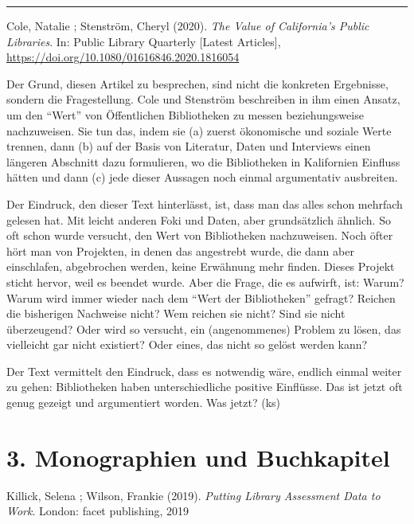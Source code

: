 \documentclass[a4paper,
fontsize=11pt,
oneside,
numbers=noperiodatend,
parskip=half-,
bibliography=totoc,
final
]{scrartcl}
\begin{document}
\begin{center}\rule{0.5\linewidth}{0.5pt}\end{center}

Cole, Natalie ; Stenström, Cheryl (2020). \emph{The Value of
California's Public Libraries}. In: Public Library Quarterly {[}Latest
Articles{]}, \url{https://doi.org/10.1080/01616846.2020.1816054}

Der Grund, diesen Artikel zu besprechen, sind nicht die konkreten
Ergebnisse, sondern die Fragestellung. Cole und Stenström beschreiben in
ihm einen Ansatz, um den \enquote{Wert} von Öffentlichen Bibliotheken zu
messen beziehungsweise nachzuweisen. Sie tun das, indem sie (a) zuerst
ökonomische und soziale Werte trennen, dann (b) auf der Basis von
Literatur, Daten und Interviews einen längeren Abschnitt dazu
formulieren, wo die Bibliotheken in Kalifornien Einfluss hätten und dann
(c) jede dieser Aussagen noch einmal argumentativ ausbreiten.

Der Eindruck, den dieser Text hinterlässt, ist, dass man das alles schon
mehrfach gelesen hat. Mit leicht anderen Foki und Daten, aber
grundsätzlich ähnlich. So oft schon wurde versucht, den Wert von
Bibliotheken nachzuweisen. Noch öfter hört man von Projekten, in denen
das angestrebt wurde, die dann aber einschlafen, abgebrochen werden,
keine Erwähnung mehr finden. Dieses Projekt sticht hervor, weil es
beendet wurde. Aber die Frage, die es aufwirft, ist: Warum? Warum wird
immer wieder nach dem \enquote{Wert der Bibliotheken} gefragt? Reichen
die bisherigen Nachweise nicht? Wem reichen sie nicht? Sind sie nicht
überzeugend? Oder wird so versucht, ein (angenommenes) Problem zu lösen,
das vielleicht gar nicht existiert? Oder eines, das nicht so gelöst
werden kann?

Der Text vermittelt den Eindruck, dass es notwendig wäre, endlich einmal
weiter zu gehen: Bibliotheken haben unterschiedliche positive Einflüsse.
Das ist jetzt oft genug gezeigt und argumentiert worden. Was jetzt? (ks)

\hypertarget{monographien-und-buchkapitel}{%
\section{3. Monographien und
Buchkapitel}\label{monographien-und-buchkapitel}}

Killick, Selena ; Wilson, Frankie (2019). \emph{Putting Library
Assessment Data to Work}. London: facet publishing, 2019
\end{document}
